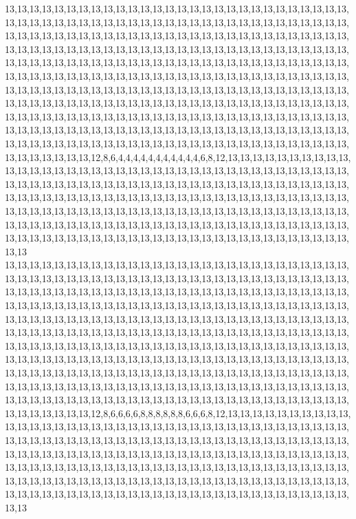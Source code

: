 13,13,13,13,13,13,13,13,13,13,13,13,13,13,13,13,13,13,13,13,13,13,13,13,13,13,13,13,13,13,13,13,13,13,13,13,13,13,13,13,13,13,13,13,13,13,13,13,13,13,13,13,13,13,13,13,13,13,13,13,13,13,13,13,13,13,13,13,13,13,13,13,13,13,13,13,13,13,13,13,13,13,13,13,13,13,13,13,13,13,13,13,13,13,13,13,13,13,13,13,13,13,13,13,13,13,13,13,13,13,13,13,13,13,13,13,13,13,13,13,13,13,13,13,13,13,13,13,13,13,13,13,13,13,13,13,13,13,13,13,13,13,13,13,13,13,13,13,13,13,13,13,13,13,13,13,13,13,13,13,13,13,13,13,13,13,13,13,13,13,13,13,13,13,13,13,13,13,13,13,13,13,13,13,13,13,13,13,13,13,13,13,13,13,13,13,13,13,13,13,13,13,13,13,13,13,13,13,13,13,13,13,13,13,13,13,13,13,13,13,13,13,13,13,13,13,13,13,13,13,13,13,13,13,13,13,13,13,13,13,13,13,13,13,13,13,13,13,13,13,13,13,13,13,13,13,13,13,13,13,13,13,13,13,13,13,13,13,13,13,13,13,13,13,13,13,13,13,13,13,13,13,13,13,13,13,13,13,13,13,13,13,13,13,13,13,13,13,13,13,13,13,13,13,13,13,13,13,13,13,13,13,13,13,13,12,8,6,4,4,4,4,4,4,4,4,4,4,4,6,8,12,13,13,13,13,13,13,13,13,13,13,13,13,13,13,13,13,13,13,13,13,13,13,13,13,13,13,13,13,13,13,13,13,13,13,13,13,13,13,13,13,13,13,13,13,13,13,13,13,13,13,13,13,13,13,13,13,13,13,13,13,13,13,13,13,13,13,13,13,13,13,13,13,13,13,13,13,13,13,13,13,13,13,13,13,13,13,13,13,13,13,13,13,13,13,13,13,13,13,13,13,13,13,13,13,13,13,13,13,13,13,13,13,13,13,13,13,13,13,13,13,13,13,13,13,13,13,13,13,13,13,13,13,13,13,13,13,13,13,13,13,13,13,13,13,13,13,13,13,13,13,13,13,13,13,13,13,13,13,13,13,13,13,13,13,13,13,13,13,13,13,13,13,13,13,13,13,13,13,13,13
13,13,13,13,13,13,13,13,13,13,13,13,13,13,13,13,13,13,13,13,13,13,13,13,13,13,13,13,13,13,13,13,13,13,13,13,13,13,13,13,13,13,13,13,13,13,13,13,13,13,13,13,13,13,13,13,13,13,13,13,13,13,13,13,13,13,13,13,13,13,13,13,13,13,13,13,13,13,13,13,13,13,13,13,13,13,13,13,13,13,13,13,13,13,13,13,13,13,13,13,13,13,13,13,13,13,13,13,13,13,13,13,13,13,13,13,13,13,13,13,13,13,13,13,13,13,13,13,13,13,13,13,13,13,13,13,13,13,13,13,13,13,13,13,13,13,13,13,13,13,13,13,13,13,13,13,13,13,13,13,13,13,13,13,13,13,13,13,13,13,13,13,13,13,13,13,13,13,13,13,13,13,13,13,13,13,13,13,13,13,13,13,13,13,13,13,13,13,13,13,13,13,13,13,13,13,13,13,13,13,13,13,13,13,13,13,13,13,13,13,13,13,13,13,13,13,13,13,13,13,13,13,13,13,13,13,13,13,13,13,13,13,13,13,13,13,13,13,13,13,13,13,13,13,13,13,13,13,13,13,13,13,13,13,13,13,13,13,13,13,13,13,13,13,13,13,13,13,13,13,13,13,13,13,13,13,13,13,13,13,13,13,13,13,13,13,13,13,13,13,13,13,13,13,13,13,13,13,13,13,13,13,13,13,13,12,8,6,6,6,6,8,8,8,8,8,8,6,6,6,8,12,13,13,13,13,13,13,13,13,13,13,13,13,13,13,13,13,13,13,13,13,13,13,13,13,13,13,13,13,13,13,13,13,13,13,13,13,13,13,13,13,13,13,13,13,13,13,13,13,13,13,13,13,13,13,13,13,13,13,13,13,13,13,13,13,13,13,13,13,13,13,13,13,13,13,13,13,13,13,13,13,13,13,13,13,13,13,13,13,13,13,13,13,13,13,13,13,13,13,13,13,13,13,13,13,13,13,13,13,13,13,13,13,13,13,13,13,13,13,13,13,13,13,13,13,13,13,13,13,13,13,13,13,13,13,13,13,13,13,13,13,13,13,13,13,13,13,13,13,13,13,13,13,13,13,13,13,13,13,13,13,13,13,13,13,13,13,13,13,13,13,13,13,13,13,13,13,13,13,13,13
